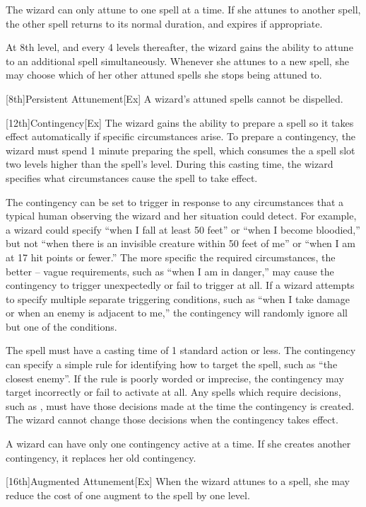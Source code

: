 The wizard can only attune to one spell at a time.
If she attunes to another spell, the other spell returns to its normal duration, and expires if appropriate.

At 8th level, and every 4 levels thereafter, the wizard gains the ability to attune to an additional spell simultaneously.
Whenever she attunes to a new spell, she may choose which of her other attuned spells she stops being attuned to.

[8th]{Persistent Attunement}[Ex]
A wizard's attuned spells cannot be dispelled.

[12th]{Contingency}[Ex]
The wizard gains the ability to prepare a spell so it takes effect automatically if specific circumstances arise.
To prepare a contingency, the wizard must spend 1 minute preparing the spell, which consumes the a spell slot two levels higher than the spell's level.
During this casting time, the wizard specifies what circumstances cause the spell to take effect.

The contingency can be set to trigger in response to any circumstances that a typical human observing the wizard and her situation could detect.
For example, a wizard could specify ``when I fall at least 50 feet'' or ``when I become bloodied,'' but not ``when there is an invisible creature within 50 feet of me'' or ``when I am at 17 hit points or fewer.'' The more specific the required circumstances, the better -- vague requirements, such as ``when I am in danger,'' may cause the contingency to trigger unexpectedly or fail to trigger at all.
If a wizard attempts to specify multiple separate triggering conditions, such as ``when I take damage or when an enemy is adjacent to me,'' the contingency will randomly ignore all but one of the conditions.

The spell must have a casting time of 1 standard action or less.
The contingency can specify a simple rule for identifying how to target the spell, such as ``the closest enemy''.
If the rule is poorly worded or imprecise, the contingency may target incorrectly or fail to activate at all.
Any spells which require decisions, such as , must have those decisions made at the time the contingency is created.
The wizard cannot change those decisions when the contingency takes effect.

A wizard can have only one contingency active at a time.
If she creates another contingency, it replaces her old contingency.

[16th]{Augmented Attunement}[Ex]
When the wizard attunes to a spell, she may reduce the cost of one augment to the spell by one level.

